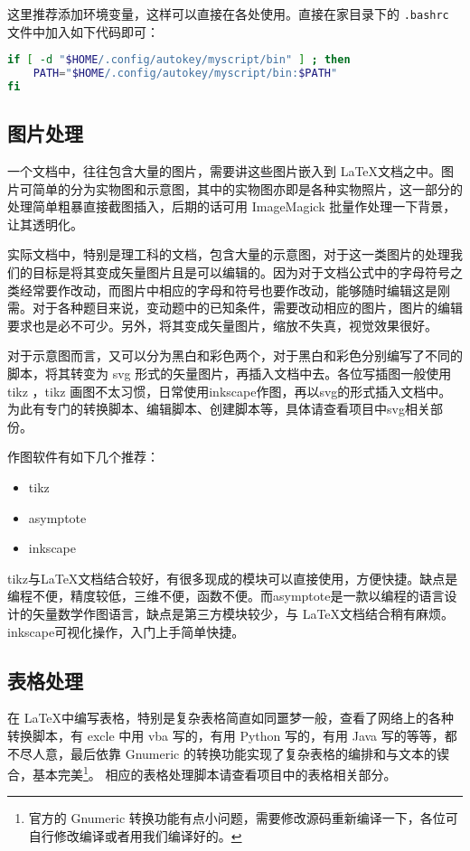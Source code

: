这里推荐添加环境变量，这样可以直接在各处使用。直接在家目录下的 \lstinline|.bashrc| 文件中加入如下代码即可：
\begin{lstlisting}[language=bash]
if [ -d "$HOME/.config/autokey/myscript/bin" ] ; then
    PATH="$HOME/.config/autokey/myscript/bin:$PATH"
fi
\end{lstlisting}

\subsection{图片处理}
一个文档中，往往包含大量的图片，需要讲这些图片嵌入到 \LaTeX 文档之中。图片可简单的分为实物图和示意图，其中的实物图亦即是各种实物照片，这一部分的处理简单粗暴直接截图插入，后期的话可用 ImageMagick 批量作处理一下背景，让其透明化。

实际文档中，特别是理工科的文档，包含大量的示意图，对于这一类图片的处理我们的目标是将其变成矢量图片且是可以编辑的。因为对于文档公式中的字母符号之类经常要作改动，而图片中相应的字母和符号也要作改动，能够随时编辑这是刚需。对于各种题目来说，变动题中的已知条件，需要改动相应的图片，图片的编辑要求也是必不可少。另外，将其变成矢量图片，缩放不失真，视觉效果很好。


对于示意图而言，又可以分为黑白和彩色两个，对于黑白和彩色分别编写了不同的脚本，将其转变为 svg 形式的矢量图片，再插入文档中去。各位写插图一般使用 tikz ，tikz 画图不太习惯，日常使用inkscape作图，再以svg的形式插入文档中。为此有专门的转换脚本、编辑脚本、创建脚本等，具体请查看项目中svg相关部份。

作图软件有如下几个推荐：
\begin{itemize}
	\item
	tikz
	\item 
	asymptote
	\item 
	inkscape 
\end{itemize}

tikz与\LaTeX 文档结合较好，有很多现成的模块可以直接使用，方便快捷。缺点是编程不便，精度较低，三维不便，函数不便。而asymptote是一款以编程的语言设计的矢量数学作图语言，缺点是第三方模块较少，与 \LaTeX 文档结合稍有麻烦。inkscape可视化操作，入门上手简单快捷。

\subsection{表格处理}

在 \LaTeX 中编写表格，特别是复杂表格简直如同噩梦一般，查看了网络上的各种转换脚本，有 excle 中用 vba 写的，有用 Python 写的，有用 Java 写的等等，都不尽人意，最后依靠 Gnumeric 的转换功能实现了复杂表格的编排和与文本的锲合，基本完美\footnote{官方的 Gnumeric 转换功能有点小问题，需要修改源码重新编译一下，各位可自行修改编译或者用我们编译好的。}。 相应的表格处理脚本请查看项目中的表格相关部分。

